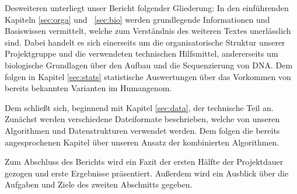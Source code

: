 Desweiteren unterliegt unser Bericht folgender Gliederung: In den einführenden Kapiteln \ref{sec:orga} und ~\ref{sec:bio} werden grundlegende Informationen und Basiswissen vermittelt, welche zum Verständnis des weiteren Textes unerlässlich sind. Dabei handelt es sich einerseits um die organisatorische Struktur unserer Projektgruppe und die verwendeten technischen Hilfsmittel, andererseits um biologische Grundlagen über den Aufbau und die Sequenzierung von DNA. Dem folgen in Kapitel \ref{sec:stats} statistische Auswertungen über das Vorkommen von bereits bekannten Varianten im Humangenom.

Dem schließt sich, beginnend mit Kapitel \ref{sec:data}, der technische Teil an. Zunächst werden verschiedene Dateiformate beschrieben, welche von unseren Algorithmen und Datenstrukturen verwendet werden. Dem folgen die bereits angesprochenen Kapitel über unseren Ansatz der kombinierten Algorithmen. 

Zum Abschluss des Berichts wird ein Fazit der ersten Hälfte der Projektdauer gezogen und erste Ergebnisse präsentiert. Außerdem wird ein Ausblick über die Aufgaben und Ziele des zweiten Abschnitts gegeben. 